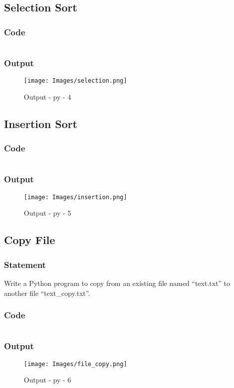\subsection{Selection Sort}

\subsubsection{Code}

\inputminted[]{python}{./code/selection_sort.py}

\subsubsection{Output}
\begin{figure}[!htb]
  \centering
  \texttt{[image: Images/selection.png]}
  \label{output:py-4}
  \caption{Output - py - 4}
\end{figure}
\pagebreak

\subsection{Insertion Sort}

\subsubsection{Code}

\inputminted[]{python}{./code/insertion_sort.py}

\subsubsection{Output}
\begin{figure}[!htb]
  \centering
  \texttt{[image: Images/insertion.png]}
  \label{output:py-5}
  \caption{Output - py - 5}
\end{figure}
\pagebreak

\subsection{Copy File}

\subsubsection{Statement}
Write a Python program to copy from an existing file named “text.txt” to another file “text\_copy.txt”.

\subsubsection{Code}

\inputminted[]{python}{./code/file_copy.py}

\subsubsection{Output}
\begin{figure}[!htb]
  \centering
  \texttt{[image: Images/file\_copy.png]}
  \label{output:py-6}
  \caption{Output - py - 6}
\end{figure}
\pagebreak
